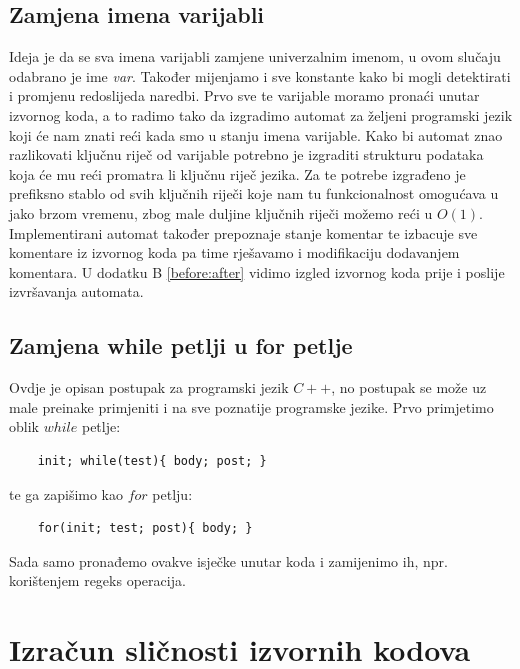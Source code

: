 \subsection{Zamjena imena varijabli}

Ideja je da se sva imena varijabli zamjene univerzalnim imenom, u ovom slučaju odabrano je ime \textit{var}. Također mijenjamo i sve konstante kako bi mogli detektirati i promjenu redoslijeda naredbi. Prvo sve te varijable moramo pronaći unutar izvornog koda, a to radimo tako da izgradimo automat za željeni programski jezik koji će nam znati reći kada smo u stanju imena varijable. Kako bi automat znao razlikovati ključnu riječ od varijable potrebno je izgraditi strukturu podataka koja će mu reći promatra li ključnu riječ jezika. Za te potrebe izgrađeno je prefiksno stablo \cite{prefix-tree} od svih ključnih riječi koje nam tu funkcionalnost omogućava u jako brzom vremenu, zbog male duljine ključnih riječi možemo reći u $O(1)$. Implementirani automat također prepoznaje stanje komentar te izbacuje sve komentare iz izvornog koda pa time rješavamo i modifikaciju dodavanjem komentara. U dodatku B \ref{before:after} vidimo izgled izvornog koda prije i poslije izvršavanja automata. \newline


\subsection{Zamjena while petlji u for petlje}

Ovdje je opisan postupak za programski jezik $C++$, no postupak se može uz male preinake primjeniti i na sve poznatije programske jezike. Prvo primjetimo oblik $while$ petlje:
\begin{lstlisting}
	init; while(test){ body; post; }
\end{lstlisting}

\noindent te ga zapišimo kao $for$ petlju:
\begin{lstlisting}
	for(init; test; post){ body; }
\end{lstlisting}

\noindent Sada samo pronađemo ovakve isječke unutar koda i zamijenimo ih, npr. korištenjem regeks operacija.

\section{Izračun sličnosti izvornih kodova}

